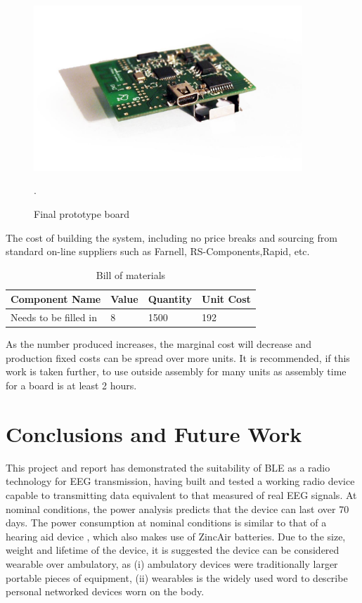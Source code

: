 \documentclass[]{article}
\begin{document}
\begin{figure}[H]
	\begin{center}
		\includegraphics[width = 0.9\textwidth]{board}
	\end{center}
	\caption{Final prototype board}. 
	\label{fig:board}
\end{figure}

The cost of building the system, including no price breaks and sourcing from standard on-line suppliers such as Farnell, RS-Components,Rapid, etc.

\begin{table}[H]
\centering
\caption{Bill of materials}
\label{fig:sensors}
\begin{tabular}{|p{1.1in}|p{1.1in}|p{1.1in}|p{1.1in}|} \hline 
\textbf{Component Name} & \textbf{Value} & \textbf{Quantity} & \textbf{Unit Cost} \\ \hline 
Needs to be filled in & 8 & 1500 & 192 \\ \hline  



\end{tabular}
\end{table}

As the number produced increases, the marginal cost will decrease and production fixed costs can be spread over more units. It is recommended, if this work is taken further, to use outside assembly for many units as assembly time for a board is at least 2 hours.

\clearpage 
\section{Conclusions and Future Work}

This project and report has demonstrated the suitability of \ac{BLE} as a radio technology for \ac{EEG} transmission, having built and tested a working radio device capable to transmitting data equivalent to that measured of real \ac{EEG} signals. At nominal conditions, the power analysis predicts that the device can last over 70 days. The power consumption at nominal conditions is similar to that of a hearing aid device \cite{hearaid}, which also makes use of ZincAir batteries. Due to the size, weight and lifetime of the device, it is suggested the device can be considered wearable over ambulatory, as (i) ambulatory devices were traditionally larger portable pieces of equipment, (ii) wearables is the widely used word to describe personal networked devices worn on the body. 
\end{document}
